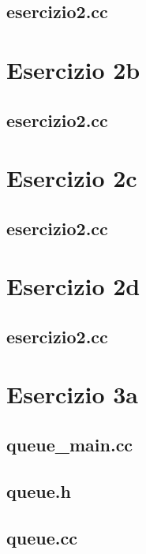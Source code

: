 \documentclass[fleqn,italian]{scrartcl}
\begin{document}
\subsection*{{esercizio2.cc}}

\newpage

\section*{Esercizio 2b}

\newpage
\subsection*{{esercizio2.cc}}

\newpage

\section*{Esercizio 2c}

\newpage
\subsection*{{esercizio2.cc}}

\newpage

\section*{Esercizio 2d}

\newpage
\subsection*{{esercizio2.cc}}

\newpage

\section*{Esercizio 3a}

\newpage
\subsection*{{queue\_main.cc}}

\subsection*{{queue.h}}

\subsection*{{queue.cc}}

\newpage
\end{document}
